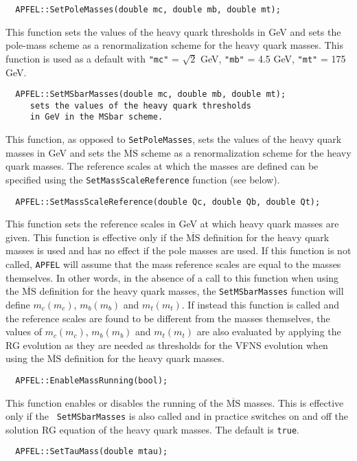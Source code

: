 \documentclass[11pt,a4paper]{article}
\begin{document}
\begin{lstlisting}
  APFEL::SetPoleMasses(double mc, double mb, double mt);
\end{lstlisting}
This function sets the values of the heavy quark thresholds in GeV and
sets the pole-mass scheme as a renormalization scheme for the heavy
quark masses. This function is used as a default with {\tt "mc"} =
$\sqrt{2}$ GeV, {\tt "mb"} = 4.5 GeV, {\tt "mt"} = 175 GeV.
\begin{lstlisting}
  APFEL::SetMSbarMasses(double mc, double mb, double mt);
     sets the values of the heavy quark thresholds
     in GeV in the MSbar scheme.
\end{lstlisting}
This function, as opposed to {\tt SetPoleMasses}, sets the values of
the heavy quark masses in GeV and sets the $\overline{\mbox{MS}}$
scheme as a renormalization scheme for the heavy quark masses. The
reference scales at which the masses are defined can be specified
using the {\tt SetMassScaleReference} function (see below).
\begin{lstlisting}
  APFEL::SetMassScaleReference(double Qc, double Qb, double Qt);
\end{lstlisting}
This function sets the reference scales in GeV at which heavy quark
masses are given. This function is effective only if the
$\overline{\mbox{MS}}$ definition for the heavy quark masses is used
and has no effect if the pole masses are used. If this function is not
called, {\tt APFEL} will assume that the mass reference scales are
equal to the masses themselves. In other words, in the absence of a
call to this function when using the $\overline{\mbox{MS}}$ definition
for the heavy quark masses, the {\tt SetMSbarMasses} function will
define $m_c(m_c)$, $m_b(m_b)$ and $m_t(m_t)$. If instead this function
is called and the reference scales are found to be different from the
masses themselves, the values of $m_c(m_c)$, $m_b(m_b)$ and $m_t(m_t)$
are also evaluated by applying the RG evolution as they are needed as
thresholds for the VFNS evolution when using the
$\overline{\mbox{MS}}$ definition for the heavy quark masses.
\begin{lstlisting}
  APFEL::EnableMassRunning(bool);
\end{lstlisting}
This function enables or disables the running of the
$\overline{\mbox{MS}}$ masses.  This is effective only if the {\tt
  SetMSbarMasses} is also called and in practice switches on and off
the solution RG equation of the heavy quark masses. The default is
{\tt true}.
\begin{lstlisting}
  APFEL::SetTauMass(double mtau);
\end{lstlisting}
\end{document}
